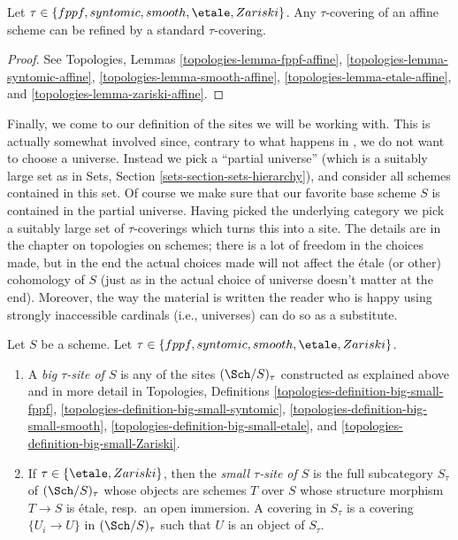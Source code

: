 \begin{lemma}
\label{lemma-tau-affine}
Let $\tau \in \{fppf, syntomic, smooth, \etale, Zariski\}$.
Any $\tau$-covering of an affine scheme can be refined by a
standard $\tau$-covering.
\end{lemma}

\begin{proof}
See
Topologies, Lemmas
\ref{topologies-lemma-fppf-affine},
\ref{topologies-lemma-syntomic-affine},
\ref{topologies-lemma-smooth-affine},
\ref{topologies-lemma-etale-affine}, and
\ref{topologies-lemma-zariski-affine}.
\end{proof}

\noindent
Finally, we come to our definition of the sites we will be working with.
This is actually somewhat involved since, contrary to what happens in
\cite{SGA4}, we do not want to choose a universe. Instead we pick a ``partial
universe'' (which is a suitably large set as in
Sets, Section \ref{sets-section-sets-hierarchy}), and consider all schemes
contained in this set. Of course we make sure that our favorite base scheme
$S$ is contained in the partial universe. Having picked the underlying category
we pick a suitably large set of $\tau$-coverings which turns this into a site.
The details are in the chapter on topologies on schemes; there is a lot of
freedom in the choices made, but in the end the actual choices made will not
affect the \'etale (or other) cohomology of $S$ (just as in \cite{SGA4} the
actual choice of universe doesn't matter at the end). Moreover, the way the
material is written the reader who is happy using strongly inaccessible
cardinals (i.e., universes) can do so as a substitute.

\begin{definition}
\label{definition-tau-site}
Let $S$ be a scheme.
Let $\tau \in \{fppf, syntomic, smooth, \etale, \linebreak[0] Zariski\}$.
\begin{enumerate}
\item A {\it big $\tau$-site of $S$} is any of the sites
$(\Sch/S)_\tau$ constructed as explained above and in more detail in
Topologies, Definitions
\ref{topologies-definition-big-small-fppf},
\ref{topologies-definition-big-small-syntomic},
\ref{topologies-definition-big-small-smooth},
\ref{topologies-definition-big-small-etale}, and
\ref{topologies-definition-big-small-Zariski}.
\item If $\tau \in \{\etale, Zariski\}$, then the
{\it small $\tau$-site of $S$}
is the full subcategory $S_\tau$ of $(\Sch/S)_\tau$ whose objects
are schemes $T$ over $S$ whose structure morphism $T \to S$ is \'etale,
resp.\ an open immersion. A covering in $S_\tau$ is a covering
$\{U_i \to U\}$ in $(\Sch/S)_\tau$
such that $U$ is an object of $S_\tau$.
\end{enumerate}
\end{definition}

